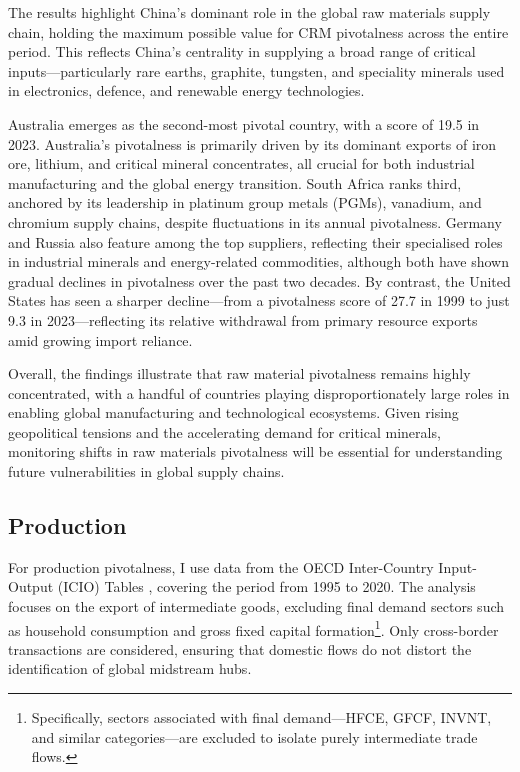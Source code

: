 \documentclass[11pt]{article}
\begin{document}
The results highlight China's dominant role in the global raw materials supply chain, holding the maximum possible value for CRM pivotalness across the entire period. This reflects China’s centrality in supplying a broad range of critical inputs—particularly rare earths, graphite, tungsten, and speciality minerals used in electronics, defence, and renewable energy technologies.

Australia emerges as the second-most pivotal country, with a score of 19.5 in 2023. Australia's pivotalness is primarily driven by its dominant exports of iron ore, lithium, and critical mineral concentrates, all crucial for both industrial manufacturing and the global energy transition. South Africa ranks third, anchored by its leadership in platinum group metals (PGMs), vanadium, and chromium supply chains, despite fluctuations in its annual pivotalness. Germany and Russia also feature among the top suppliers, reflecting their specialised roles in industrial minerals and energy-related commodities, although both have shown gradual declines in pivotalness over the past two decades. By contrast, the United States has seen a sharper decline—from a pivotalness score of 27.7 in 1999 to just 9.3 in 2023—reflecting its relative withdrawal from primary resource exports amid growing import reliance.

Overall, the findings illustrate that raw material pivotalness remains highly concentrated, with a handful of countries playing disproportionately large roles in enabling global manufacturing and technological ecosystems. Given rising geopolitical tensions and the accelerating demand for critical minerals, monitoring shifts in raw materials pivotalness will be essential for understanding future vulnerabilities in global supply chains.


\subsection{Production}

For production pivotalness, I use data from the OECD Inter-Country Input-Output (ICIO) Tables \citep{oecdicio2023}, covering the period from 1995 to 2020. The analysis focuses on the export of intermediate goods, excluding final demand sectors such as household consumption and gross fixed capital formation\footnote{Specifically, sectors associated with final demand—HFCE, GFCF, INVNT, and similar categories—are excluded to isolate purely intermediate trade flows.}. Only cross-border transactions are considered, ensuring that domestic flows do not distort the identification of global midstream hubs.
\end{document}
